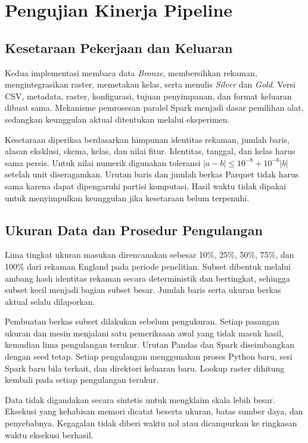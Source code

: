 \section{Pengujian Kinerja Pipeline}

\subsection{Kesetaraan Pekerjaan dan Keluaran}

Kedua implementasi membaca data \textit{Bronze}, membersihkan rekaman, mengintegrasikan raster, memetakan kelas, serta menulis \textit{Silver} dan \textit{Gold}. Versi CSV, metadata, raster, konfigurasi, tujuan penyimpanan, dan format keluaran dibuat sama. Mekanisme pemrosesan paralel Spark \cite{zaharia_apache_2016} menjadi dasar pemilihan alat, sedangkan keunggulan aktual ditentukan melalui eksperimen.

Kesetaraan diperiksa berdasarkan himpunan identitas rekaman, jumlah baris, alasan eksklusi, skema, kelas, dan nilai fitur. Identitas, tanggal, dan kelas harus sama persis. Untuk nilai numerik digunakan toleransi $|a-b|\leq10^{-8}+10^{-6}|b|$ setelah unit diseragamkan. Urutan baris dan jumlah berkas Parquet tidak harus sama karena dapat dipengaruhi partisi komputasi. Hasil waktu tidak dipakai untuk menyimpulkan keunggulan jika kesetaraan belum terpenuhi.

\subsection{Ukuran Data dan Prosedur Pengulangan}

Lima tingkat ukuran masukan direncanakan sebesar 10\%, 25\%, 50\%, 75\%, dan 100\% dari rekaman England pada periode penelitian. Subset dibentuk melalui ambang hash identitas rekaman secara deterministik dan bertingkat, sehingga subset kecil menjadi bagian subset besar. Jumlah baris serta ukuran berkas aktual selalu dilaporkan.

Pembuatan berkas subset dilakukan sebelum pengukuran. Setiap pasangan ukuran dan mesin menjalani satu pemeriksaan awal yang tidak masuk hasil, kemudian lima pengulangan terukur. Urutan Pandas dan Spark diseimbangkan dengan seed tetap. Setiap pengulangan menggunakan proses Python baru, sesi Spark baru bila terkait, dan direktori keluaran baru. Lookup raster dihitung kembali pada setiap pengulangan terukur.

Data tidak digandakan secara sintetis untuk mengklaim skala lebih besar. Eksekusi yang kehabisan memori dicatat beserta ukuran, batas sumber daya, dan penyebabnya. Kegagalan tidak diberi waktu nol atau dicampurkan ke ringkasan waktu eksekusi berhasil.

